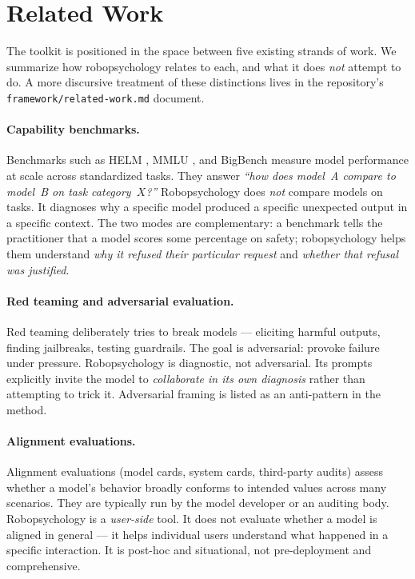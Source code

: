\section{Related Work}
\label{sec:related}

The toolkit is positioned in the space between five existing strands of
work. We summarize how robopsychology relates to each, and what it
does \emph{not} attempt to do. A more discursive treatment of these
distinctions lives in the repository's \texttt{framework/related-work.md}
document.

\paragraph{Capability benchmarks.}
Benchmarks such as HELM \citep{liang2022holistic}, MMLU
\citep{hendrycks2020measuring}, and BigBench
\citep{srivastava2022beyond} measure model performance at scale across
standardized tasks. They answer \emph{``how does model~A compare to
model~B on task category~$X$?''} Robopsychology does \emph{not}
compare models on tasks. It diagnoses why a specific model produced a
specific unexpected output in a specific context. The two modes are
complementary: a benchmark tells the practitioner that a model scores
some percentage on safety; robopsychology helps them understand
\emph{why it refused their particular request} and \emph{whether that
refusal was justified}.

\paragraph{Red teaming and adversarial evaluation.}
Red teaming \citep{perez2022red, ganguli2022red} deliberately tries to
break models --- eliciting harmful outputs, finding jailbreaks, testing
guardrails. The goal is adversarial: provoke failure under pressure.
Robopsychology is diagnostic, not adversarial. Its prompts explicitly
invite the model to \emph{collaborate in its own diagnosis} rather than
attempting to trick it. Adversarial framing is listed as an
anti-pattern in the method.

\paragraph{Alignment evaluations.}
Alignment evaluations (model cards, system cards, third-party audits)
assess whether a model's behavior broadly conforms to intended values
across many scenarios. They are typically run by the model developer
or an auditing body. Robopsychology is a \emph{user-side} tool. It does
not evaluate whether a model is aligned in general --- it helps
individual users understand what happened in a specific interaction.
It is post-hoc and situational, not pre-deployment and comprehensive.

